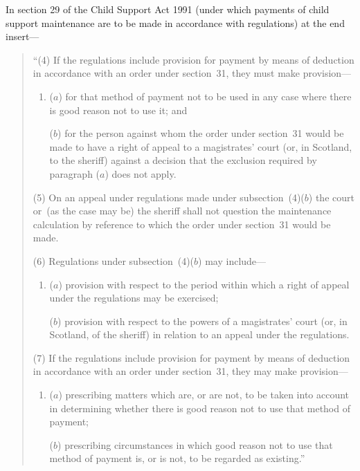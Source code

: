 \documentclass[12pt,a4paper]{article}
\begin{document}
In section 29 of the Child Support Act 1991 (under which payments of child support maintenance are to be made in accordance with regulations) at the end insert—
\begin{quotation}
“(4) If the regulations include provision for payment by means of deduction in accordance with an order under section~31, they must make provision—
\begin{enumerate}\item[]
($a$) for that method of payment not to be used in any case where there is good reason not to use it; and

($b$) for the person against whom the order under section~31 would be made to have a right of appeal to a magistrates' court (or, in Scotland, to the sheriff) against a decision that the exclusion required by paragraph ($a$) does not apply.
\end{enumerate}

\begin{sloppypar}
(5) On an appeal under regulations made under subsection~(4)($b$) the court or~(as the case may be) the sheriff shall not question the maintenance calculation by reference to which the order under section~31 would be made.
\end{sloppypar}

(6) Regulations under subsection~(4)($b$) may include—
\begin{enumerate}\item[]
($a$) provision with respect to the period within which a right of appeal under the regulations may be exercised;

($b$) provision with respect to the powers of a magistrates' court (or, in Scotland, of the sheriff) in relation to an appeal under the regulations.
\end{enumerate}

(7) If the regulations include provision for payment by means of deduction in accordance with an order under section~31, they may make provision—
\begin{enumerate}\item[]
($a$) prescribing matters which are, or are not, to be taken into account in determining whether there is good reason not to use that method of payment;

($b$) prescribing circumstances in which good reason not to use that method of payment is, or is not, to be regarded as existing.”
\end{enumerate}
\end{quotation}
\end{document}
